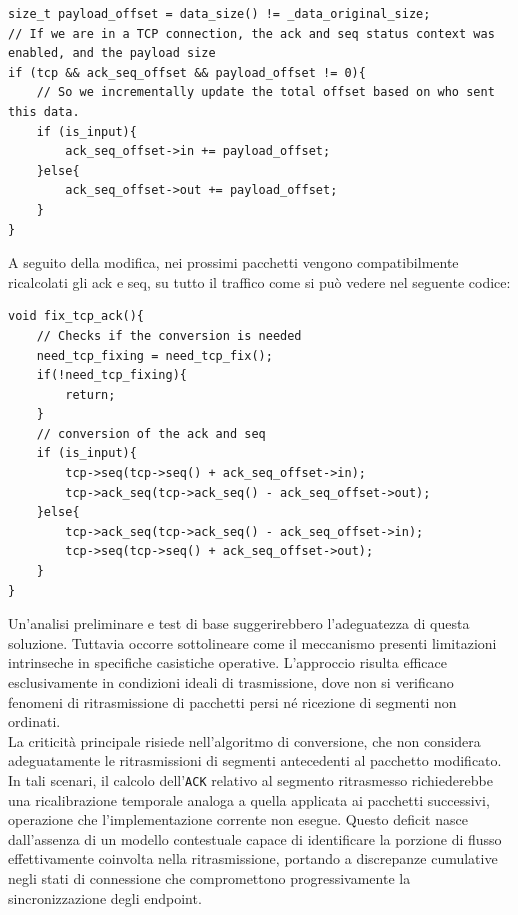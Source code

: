 \begin{listing}[H]
    \begin{verbatim}
size_t payload_offset = data_size() != _data_original_size;
// If we are in a TCP connection, the ack and seq status context was enabled, and the payload size 
if (tcp && ack_seq_offset && payload_offset != 0){
    // So we incrementally update the total offset based on who sent this data.
    if (is_input){
        ack_seq_offset->in += payload_offset;
    }else{
        ack_seq_offset->out += payload_offset;
    }
}
\end{verbatim}
\end{listing}

A seguito della modifica, nei prossimi pacchetti vengono compatibilmente ricalcolati gli ack e seq, su tutto il traffico come si può vedere nel seguente codice:

\begin{listing}[H]
    \begin{verbatim}
void fix_tcp_ack(){
    // Checks if the conversion is needed
    need_tcp_fixing = need_tcp_fix();
    if(!need_tcp_fixing){
        return;
    }
    // conversion of the ack and seq
    if (is_input){
        tcp->seq(tcp->seq() + ack_seq_offset->in);
        tcp->ack_seq(tcp->ack_seq() - ack_seq_offset->out);
    }else{
        tcp->ack_seq(tcp->ack_seq() - ack_seq_offset->in);
        tcp->seq(tcp->seq() + ack_seq_offset->out);
    }
}
\end{verbatim}
\end{listing}


Un'analisi preliminare e test di base suggerirebbero l'adeguatezza di questa soluzione. Tuttavia occorre sottolineare come il meccanismo presenti limitazioni intrinseche in specifiche casistiche operative. L'approccio risulta efficace esclusivamente in condizioni ideali di trasmissione, dove non si verificano fenomeni di ritrasmissione di pacchetti persi né ricezione di segmenti non ordinati.\\

La criticità principale risiede nell'algoritmo di conversione, che non considera adeguatamente le ritrasmissioni di segmenti antecedenti al pacchetto modificato. In tali scenari, il calcolo dell'\texttt{ACK} relativo al segmento ritrasmesso richiederebbe una ricalibrazione temporale analoga a quella applicata ai pacchetti successivi, operazione che l'implementazione corrente non esegue. Questo deficit nasce dall'assenza di un modello contestuale capace di identificare la porzione di flusso effettivamente coinvolta nella ritrasmissione, portando a discrepanze cumulative negli stati di connessione che compromettono progressivamente la sincronizzazione degli endpoint.

